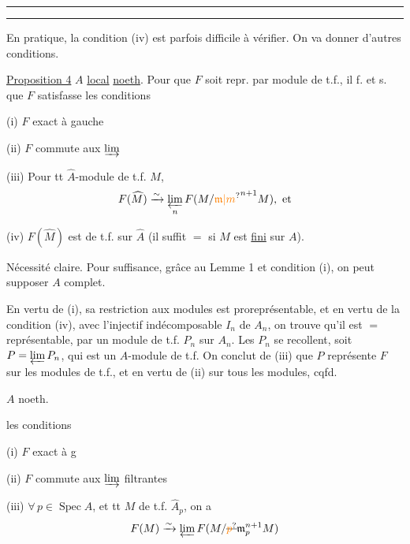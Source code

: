 \noindent\rule{\linewidth}{0.4pt}\par\nobreak\noindent\rule{\linewidth}{0.4pt}

En pratique, la condition (iv) est parfois difficile à vérifier. On va donner d'autres conditions.

\uline{Proposition 4} \quad $A$ \uline{local} \uline{noeth}. Pour que $F$ soit repr. par module de t.f., il f. et s. que $F$ satisfasse les conditions

(i) $F$ exact à gauche

(ii) $F$ commute aux $\varinjlim$

(iii) Pour tt $\widehat A$-module de t.f. $M$,
\[
F(\widehat M)\xrightarrow{\sim}\varprojlim_{n}F(M/{\unsure{\mathfrak m|m}}^{n+1}M),\ \text{et}
\]

(iv)  $F(\widehat M)$ est de t.f. sur $\widehat A$ (il suffit $=$ si $M$ est \uline{fini} sur $A$).

Nécessité claire. Pour suffisance, grâce au Lemme 1 et condition (i), on peut supposer $A$ complet.

En vertu de (i), sa restriction aux modules   est proreprésentable,   et en vertu de la condition (iv),  avec l'injectif indécomposable $I_n$ de $A_n$, on trouve qu'il est $=$ représentable,  par un module de t.f. $P_n$ sur $A_n$. Les $P_n$ se recollent, soit $P=\varprojlim P_n$, qui est un $A$-module de t.f. On conclut de (iii) que $P$ représente $F$ sur les modules de t.f., et en vertu de (ii) sur tous les modules, cqfd.

  \quad $A$ noeth. 

 

  les conditions

(i) $F$ exact  à g

(ii) $F$ commute aux $\varinjlim$ filtrantes

(iii) $\forall\,p\in\operatorname{Spec} A$, et tt $M$ de t.f. $\widehat A_p$, on a
\[
F(M)\xrightarrow{\sim}\varprojlim F(M/\deleted{\unsure{p}} \mathfrak m_p^{n+1}M)
\]

